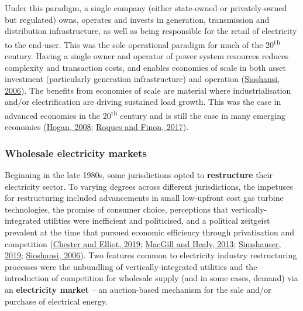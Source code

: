 \documentclass[12pt,a4paper,]{report}
\begin{document}
Under this paradigm, a single company (either state-owned or
privately-owned but regulated) owns, operates and invests in generation,
transmission and distribution infrastructure, as well as being
responsible for the retail of electricity to the end-user. This was the
sole operational paradigm for much of the 20\textsuperscript{th}
century. Having a single owner and operator of power system resources
reduces complexity and transaction costs, and enables economies of scale
in both asset investment (particularly generation infrastructure) and
operation
(\protect\hyperlink{ref-sioshansiElectricityMarketReform2006}{Sioshansi,
2006}). The benefits from economies of scale are material where
industrialisation and/or electrification are driving sustained load
growth. This was the case in advanced economies in the
20\textsuperscript{th} century and is still the case in many emerging
economies
(\protect\hyperlink{ref-hoganElectricityMarketStructure2008}{Hogan,
2008};
\protect\hyperlink{ref-roquesAdaptingElectricityMarkets2017}{Roques and
Finon, 2017}).

\hypertarget{wholesale-electricity-markets}{%
\subsubsection{Wholesale electricity
markets}\label{wholesale-electricity-markets}}

Beginning in the late 1980s, some jurisdictions opted to
\textbf{restructure} their electricity sector. To varying degrees across
different jurisdictions, the impetuses for restructuring included
advancements in small low-upfront cost gas turbine technologies, the
promise of consumer choice, perceptions that vertically-integrated
utilities were inefficient and politicised, and a political zeitgeist
prevalent at the time that pursued economic efficiency through
privatisation and competition
(\protect\hyperlink{ref-chesterEnergyProblemRepresentation2019}{Chester
and Elliot, 2019};
\protect\hyperlink{ref-macgillElectricityIndustryReform2013}{MacGill and
Healy, 2013};
\protect\hyperlink{ref-simshauserLessonsAustraliaNational2019}{Simshauser,
2019};
\protect\hyperlink{ref-sioshansiElectricityMarketReform2006}{Sioshansi,
2006}). Two features common to electricity industry restructuring
processes were the unbundling of vertically-integrated utilities and the
introduction of competition for wholesale supply (and in some cases,
demand) via an \textbf{electricity market} -- an auction-based mechanism
for the sale and/or purchase of electrical energy.
\end{document}
